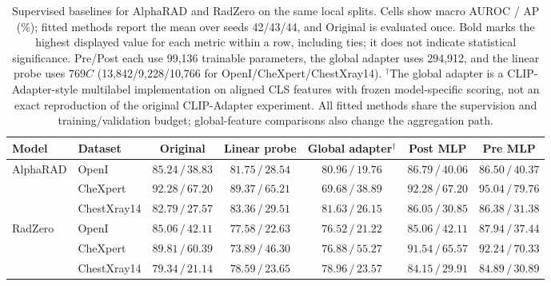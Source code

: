 \begin{table}[!t]
\centering
\small
\setlength{\tabcolsep}{3pt}
\renewcommand{\arraystretch}{1.15}
\begin{tabular*}{\textwidth}{@{\extracolsep{\fill}}llccccc@{}}
\toprule
Model & Dataset & Original & Linear probe & Global adapter$^{\dagger}$ & Post MLP & Pre MLP \\
\midrule
\multirow{3}{*}{AlphaRAD} & OpenI & $85.24\,/\,38.83$ & $81.75\,/\,28.54$ & $80.96\,/\,19.76$ & $\mathbf{86.79}\,/\,40.06$ & $86.50\,/\,\mathbf{40.37}$ \\
 & CheXpert & $92.28\,/\,67.20$ & $89.37\,/\,65.21$ & $69.68\,/\,38.89$ & $92.28\,/\,67.20$ & $\mathbf{95.04}\,/\,\mathbf{79.76}$ \\
 & ChestXray14 & $82.79\,/\,27.57$ & $83.36\,/\,29.51$ & $81.63\,/\,26.15$ & $86.05\,/\,30.85$ & $\mathbf{86.38}\,/\,\mathbf{31.38}$ \\
\midrule
\multirow{3}{*}{RadZero} & OpenI & $85.06\,/\,\mathbf{42.11}$ & $77.58\,/\,22.63$ & $76.52\,/\,21.22$ & $85.06\,/\,\mathbf{42.11}$ & $\mathbf{87.94}\,/\,37.44$ \\
 & CheXpert & $89.81\,/\,60.39$ & $73.89\,/\,46.30$ & $76.88\,/\,55.27$ & $91.54\,/\,65.57$ & $\mathbf{92.24}\,/\,\mathbf{70.33}$ \\
 & ChestXray14 & $79.34\,/\,21.14$ & $78.59\,/\,23.65$ & $78.96\,/\,23.57$ & $84.15\,/\,29.91$ & $\mathbf{84.89}\,/\,\mathbf{30.89}$ \\
\bottomrule
\end{tabular*}
\caption{Supervised baselines for AlphaRAD and RadZero on the same local splits. Cells show macro AUROC / AP (\%); fitted methods report the mean over seeds 42/43/44, and Original is evaluated once. Bold marks the highest displayed value for each metric within a row, including ties; it does not indicate statistical significance. Pre/Post each use 99,136 trainable parameters, the global adapter uses 294,912, and the linear probe uses $769C$ (13,842/9,228/10,766 for OpenI/CheXpert/ChestXray14). $^{\dagger}$The global adapter is a CLIP-Adapter-style multilabel implementation on aligned CLS features with frozen model-specific scoring, not an exact reproduction of the original CLIP-Adapter experiment. All fitted methods share the supervision and training/validation budget; global-feature comparisons also change the aggregation path.}
\label{tab:token_mlp_supervised_baselines}
\end{table}

